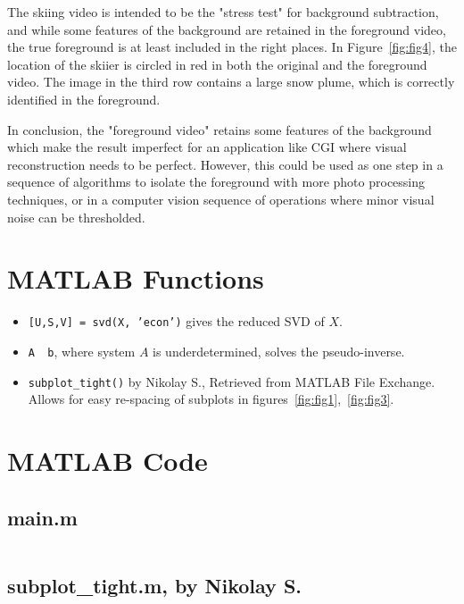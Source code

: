 \documentclass{article}
\begin{document}
The skiing video is intended to be the "stress test" for background subtraction, and while some features of the background are retained in the foreground video, the true foreground is at least included in the right places. In Figure~\ref{fig:fig4}, the location of the skiier is circled in red in both the original and the foreground video. The image in the third row contains a large snow plume, which is correctly identified in the foreground.

In conclusion, the "foreground video" retains some features of the background which make the result imperfect for an application like CGI where visual reconstruction needs to be perfect. However, this could be used as one step in a sequence of algorithms to isolate the foreground with more photo processing techniques, or in a computer vision sequence of operations where minor visual noise can be thresholded.

\printbibliography
\newpage 
\begin{appendices}

\section{MATLAB Functions}

\begin{itemize}
	\item \texttt{[U,S,V] = svd(X, 'econ')} gives the reduced SVD of $X$.
	
	\item \texttt{A \ b}, where system $A$ is underdetermined, solves the pseudo-inverse.
	
    \item \texttt{subplot\_tight()} by Nikolay S., Retrieved from MATLAB File Exchange. Allows for easy re-spacing of subplots in figures~\ref{fig:fig1},~\ref{fig:fig3}.
\end{itemize}

\section{MATLAB Code}

\subsection{main.m}
\inputminted{matlab}{main.m}

\subsection{subplot\_tight.m, by Nikolay S.}
\inputminted{matlab}{subplot_tight.m}
\end{appendices}
\end{document}
